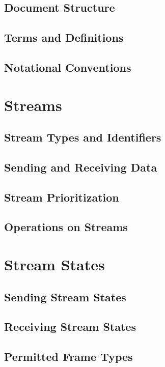 \documentclass{article}
\begin{document}
\subsection{Document Structure}

\subsection{Terms and Definitions}

\subsection{Notational Conventions}

\section{Streams}

\subsection{Stream Types and Identifiers}

\subsection{Sending and Receiving Data}

\subsection{Stream Prioritization}

\subsection{Operations on Streams}

\section{Stream States}

\subsection{Sending Stream States}

\subsection{Receiving Stream States}

\subsection{Permitted Frame Types}
\end{document}
